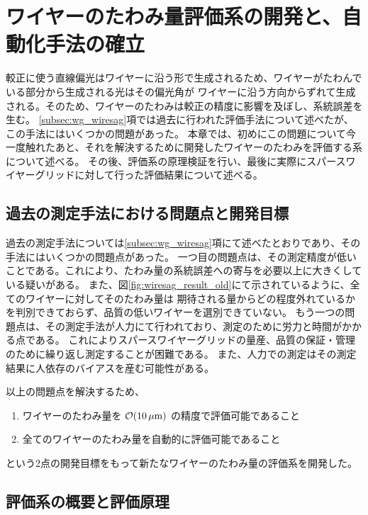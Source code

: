\documentclass[../../main.tex]{subfiles}
\begin{document}
\chapter{ワイヤーのたわみ量評価系の開発と、自動化手法の確立}
\label{chap:wiresag}
較正に使う直線偏光はワイヤーに沿う形で生成されるため、ワイヤーがたわんでいる部分から生成される光はその偏光角が
ワイヤーに沿う方向からずれて生成される。そのため、ワイヤーのたわみは較正の精度に影響を及ぼし、系統誤差を生む。
\ref{subsec:wg_wiresag}項では過去に行われた評価手法について述べたが、この手法にはいくつかの問題があった。
本章では、初めにこの問題について今一度触れたあと、それを解決するために開発したワイヤーのたわみを評価する系について述べる。
その後、評価系の原理検証を行い、最後に実際にスパースワイヤーグリッドに対して行った評価結果について述べる。

\section{過去の測定手法における問題点と開発目標}

過去の測定手法については\ref{subsec:wg_wiresag}項にて述べたとおりであり、その手法にはいくつかの問題点があった。
一つ目の問題点は、その測定精度が低いことである。これにより、たわみ量の系統誤差への寄与を必要以上に大きくしている疑いがある。
また、図\ref{fig:wiresag_result_old}にて示されているように、全てのワイヤーに対してそのたわみ量は
期待される量からどの程度外れているかを判別できておらず、品質の低いワイヤーを選別できていない。
もう一つの問題点は、その測定手法が人力にて行われており、測定のために労力と時間がかかる点である。
これによりスパースワイヤーグリッドの量産、品質の保証・管理のために繰り返し測定することが困難である。
また、人力での測定はその測定結果に人依存のバイアスを産む可能性がある。

以上の問題点を解決するため、
\begin{enumerate}
    \item ワイヤーのたわみ量を $\order{\SI{10}{\mu m}}$ の精度で評価可能であること
    \item 全てのワイヤーのたわみ量を自動的に評価可能であること
\end{enumerate}
という2点の開発目標をもって新たなワイヤーのたわみ量の評価系を開発した。

\section{評価系の概要と評価原理}
\end{document}
